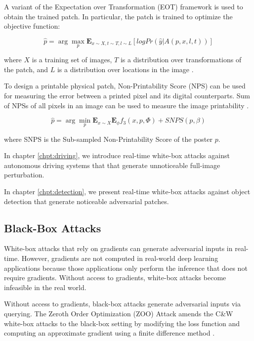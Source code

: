 A variant of the Expectation over Transformation (EOT) framework \citep{athalye2018synthesizing} is used to obtain the trained patch. In particular, the patch is trained to optimize the objective function:

$$\hat{p} = \arg \underset{p}{\max}\mathbf{E}_{x \sim X, t \sim T,l \sim L}[logPr(\hat{y}|A(p,x,l,t))]$$

where $X$ is a training set of images, $T$ is a distribution over transformations of the patch, and $L$ is a distribution over locations in the image \citep{brown2018adversarial}.

To design a printable physical patch, Non-Printability Score (NPS) can be used for measuring the error between a printed pixel and its digital counterparts. Sum of NPSs of all pixels in an image can be used to measure the image printability \citep{wang2021daedalus}.

$$\hat{p} = \arg \underset{p}{\min}\mathbf{E}_{x \sim X}\mathbf{E}_\phi f_3(x, p, \Phi) + SNPS(p, \beta)$$

where SNPS is the Sub-sampled Non-Printability Score of the poster $p$.

In chapter \ref{chpt:driving}, we introduce real-time white-box attacks against autonomous driving systems that that generate unnoticeable full-image perturbation.

In chapter \ref{chpt:detection}, we present real-time white-box attacks against object detection that generate noticeable adversarial patches.


\subsection{Black-Box Attacks}
\label{sec:blackbox_attack}

White-box attacks that rely on gradients can generate adversarial inputs in real-time. However, gradients are not computed in real-world deep learning applications because those applications only perform the inference that does not require gradients. Without access to gradients, white-box attacks become infeasible in the real world.

Without access to gradients, black-box attacks generate adversarial inputs via querying. The Zeroth Order Optimization (ZOO) Attack amends the C\&W white-box attacks to the black-box setting by modifying the loss function and computing an approximate gradient using a finite difference method \citep{Chen_2017}.

